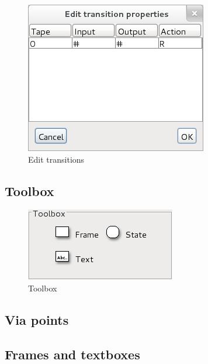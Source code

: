 \documentclass[%
  a4paper,%
  11pt,%
  blue,%
  hyperref	%
  ]{tubsartcl}
\begin{document}
\begin{figure}[!htb]
\begin{center}
\includegraphics[scale=0.5]{graphics_gui/edit_transitions.png}
\end{center}
\caption{Edit transitions}
\label{pic:edit_transitions}
\end{figure}

\newpage

\subsection{Toolbox}
\label{sec:toolbox}

\begin{figure}[!htb]
\begin{center}
\includegraphics[scale=0.5]{graphics_gui/toolbox_turing.png}
\end{center}
\caption{Toolbox}
\label{pic:toolbox}
\end{figure}

\newpage

\subsection{Via points}
\label{sec:via-points}

\subsection{Frames and textboxes}
\label{sec:frames-textboxes}
\end{document}
